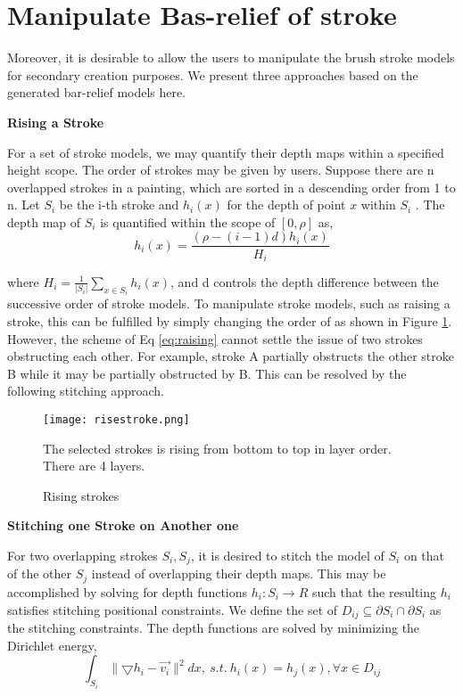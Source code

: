 \section{Manipulate Bas-relief of stroke}

Moreover, it is desirable to allow the users to manipulate the brush stroke models for secondary creation purposes. We present three approaches based on the generated bar-relief models here.

\textbf{Rising a Stroke}  

For a set of stroke models, we may quantify their depth maps within a specified height scope. The order of strokes may be given by users. Suppose there are n overlapped strokes in a painting, which are sorted in a descending order from 1 to n. Let $S_i$ be the i-th stroke and $h_i(x)$ for the depth of point $x$ within $S_i$ . The depth map of $S_i$ is quantified within the scope of $[0,\rho]$ as,
\begin{equation}
h_i(x)= \frac{(\rho-(i-1)d)h_i(x)}{H_i}
\label{eq:raising}
\end{equation}

where $H_i=\frac{1}{\lvert S_i \rvert}\sum_{x\in S_i} h_i(x)  $, and d controls the depth difference between the successive order of stroke models. To manipulate stroke models, such as raising a stroke, this can be fulfilled by simply changing the order of  as shown in Figure \ref{raising}.
However, the scheme of Eq \ref{eq:raising} cannot settle the issue of two strokes obstructing each other. For example, stroke A partially obstructs the other stroke B while it may be partially obstructed by B. This can be resolved by the following stitching approach.\newline
\begin{figure}[H]
	\centering
	\texttt{[image: risestroke.png]}
	\caption{Rising strokes}
	\label{raising}
	\medskip
	The selected strokes is rising from bottom to top in layer order. \\There are 4 layers.
\end{figure}

\textbf{Stitching one Stroke on Another one} 
\newline

For two overlapping strokes $S_i,S_j$, it is desired to stitch the model of $S_i$ on that of the other $S_j$ instead of overlapping their depth maps. This may be accomplished by solving for depth functions $h_i:S_i\rightarrow R $ such that the resulting $h_i$ satisfies stitching positional constraints. We define the set of $ D_{ij} \subseteq \partial S_i \cap \partial S_i $ as the stitching constraints. The depth functions are solved by minimizing the Dirichlet energy, 
\begin{equation}
 \int_{S_i} \lVert \bigtriangledown h_i - \vec{v_i} \rVert ^2 dx ,~ s.t. ~h_i(x)=h_j(x),\forall x \in D_{ij}
 \label{eq:stitch}
\end{equation}

